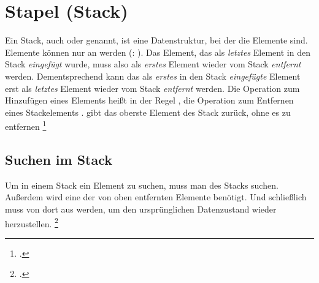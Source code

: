 \documentclass{bschlangaul-theorie}
\begin{document}

\chapter{Stapel (Stack)}

\begin{bQuellen}
\item \cite[Seite 275-281 (PDF 291-297)]{saake}
\item \cite{wiki:stapelspeicher}
\item \cite[Kapitel 6.2.1.4 Seite 182]{schneider}
\end{bQuellen}

Ein Stack, auch  oder  genannt, ist eine
Datenstruktur, bei der die Elemente 
sind. Elemente können nur an  werden (: ).
%
Das Element, das als \emph{letztes} Element in den Stack
\emph{eingefügt} wurde, muss also als \emph{erstes} Element wieder vom
Stack \emph{entfernt} werden.
%
Dementsprechend kann das als \emph{erstes} in den Stack
\emph{eingefügte} Element erst als \emph{letztes} Element wieder vom
Stack \emph{entfernt} werden.
%
Die Operation zum Hinzufügen eines Elements heißt in der Regel
, die Operation zum Entfernen eines Stackelements
.  gibt das oberste Element des Stack zurück,
ohne es zu entfernen
\footcite[Seite 19 (PDF 17)]{aud:fs:4}

%

\section{Suchen im Stack}

Um in einem Stack ein Element zu suchen, muss man  des Stacks suchen.
%
Außerdem wird eine  der
von oben entfernten Elemente benötigt.
%
Und schließlich muss von dort aus 
werden, um den ursprünglichen Datenzustand wieder herzustellen.
\footcite[Seite 20 (PDF 18)]{aud:fs:4}


\literatur
\end{document}
